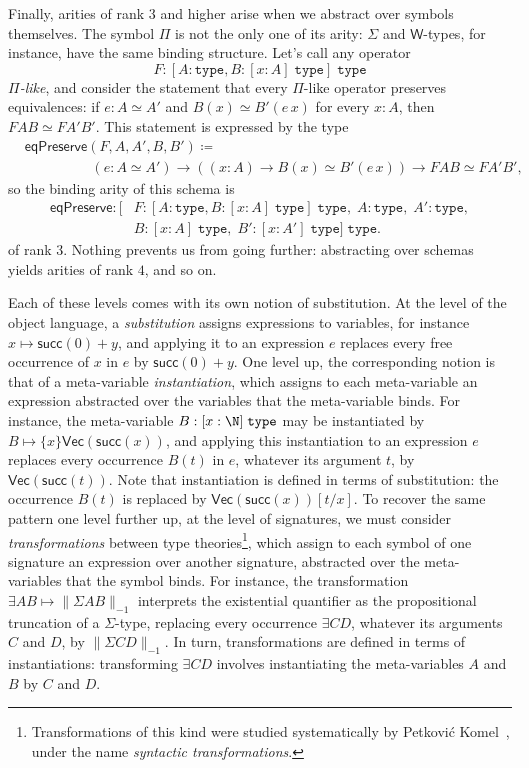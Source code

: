 Finally, arities of rank $3$ and higher arise when we abstract over symbols themselves. The symbol $\Pi$ is not the only one of its arity: $\Sigma$ and $\mathsf{W}$-types, for instance, have the same binding structure. Let's call any operator
$$F : [A : \texttt{type}, B : [x : A] \; \texttt{type}] \; \texttt{type}$$
\emph{$\Pi$-like}, and consider the statement that every $\Pi$-like operator preserves equivalences: if $e : A \simeq A'$ and $B(x) \simeq B'(e\,x)$ for every $x : A$, then $F A B \simeq F A' B'$. This statement is expressed by the type
\begin{align*}
    &\mathsf{eqPreserve}(F, A, A', B, B') \coloneqq\\
    &\hspace{2cm}(e : A \simeq A') \to ((x : A) \to B(x) \simeq B'(e\,x)) \to F A B \simeq F A' B',
\end{align*}
so the binding arity of this schema is
\begin{align*}
\mathsf{eqPreserve} : [&F : [A : \texttt{type}, B : [x : A] \; \texttt{type}] \; \texttt{type},\; A : \texttt{type},\; A' : \texttt{type},\\
&B : [x : A] \; \texttt{type},\; B' : [x : A'] \; \texttt{type}] \; \texttt{type}.
\end{align*}
of rank $3$. Nothing prevents us from going further: abstracting over schemas yields arities of rank $4$, and so on.

Each of these levels comes with its own notion of substitution. At the level of the object language, a \emph{substitution} assigns expressions to variables, for instance $x \mapsto \mathsf{succ}(0) + y$, and applying it to an expression $e$ replaces every free occurrence of $x$ in $e$ by $\mathsf{succ}(0) + y$. One level up, the corresponding notion is that of a meta-variable \emph{instantiation}, which assigns to each meta-variable an expression abstracted over the variables that the meta-variable binds. For instance, the meta-variable $B : [x : \N] \; \texttt{type}$ may be instantiated by $B \mapsto \{x\}\mathsf{Vec}(\mathsf{succ}(x))$, and applying this instantiation to an expression $e$ replaces every occurrence $B(t)$ in $e$, whatever its argument $t$, by $\mathsf{Vec}(\mathsf{succ}(t))$. Note that instantiation is defined in terms of substitution: the occurrence $B(t)$ is replaced by $\mathsf{Vec}(\mathsf{succ}(x))[t/x]$. To recover the same pattern one level further up, at the level of signatures, we must consider \emph{transformations} between type theories\footnote{Transformations of this kind were studied systematically by Petković Komel~\cite[Ch.~8]{PetkovicKomel2021}, under the name \emph{syntactic transformations}.}, which assign to each symbol of one signature an expression over another signature, abstracted over the meta-variables that the symbol binds. For instance, the transformation $\exists A B \mapsto \lVert \Sigma A B \rVert_{-1}$ interprets the existential quantifier as the propositional truncation of a $\Sigma$-type, replacing every occurrence $\exists C D$, whatever its arguments $C$ and $D$, by $\lVert \Sigma C D \rVert_{-1}$. In turn, transformations are defined in terms of instantiations: transforming $\exists C D$ involves instantiating the meta-variables $A$ and $B$ by $C$ and $D$.

